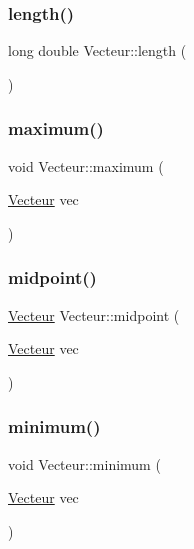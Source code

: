 \mbox{\label{classVecteur_a2679bc92e61a0ac2ddffed113eb2b00d}} 
\subsubsection{\texorpdfstring{length()}{length()}}
{\footnotesize\ttfamily long double Vecteur\+::length (\begin{DoxyParamCaption}{ }\end{DoxyParamCaption})}

\mbox{\label{classVecteur_acdb9760e842eeea4c2dc285713f97bf2}} 
\subsubsection{\texorpdfstring{maximum()}{maximum()}}
{\footnotesize\ttfamily void Vecteur\+::maximum (\begin{DoxyParamCaption}\item[{\mbox{\hyperlink{classVecteur}{Vecteur}}}]{vec }\end{DoxyParamCaption})}

\mbox{\label{classVecteur_a02fe1ecb17ffe58c304b38d9ab6239a5}} 
\subsubsection{\texorpdfstring{midpoint()}{midpoint()}}
{\footnotesize\ttfamily \mbox{\hyperlink{classVecteur}{Vecteur}} Vecteur\+::midpoint (\begin{DoxyParamCaption}\item[{\mbox{\hyperlink{classVecteur}{Vecteur}}}]{vec }\end{DoxyParamCaption})}

\mbox{\label{classVecteur_ad7b877d84e920d435e80e1b91ff7f991}} 
\subsubsection{\texorpdfstring{minimum()}{minimum()}}
{\footnotesize\ttfamily void Vecteur\+::minimum (\begin{DoxyParamCaption}\item[{\mbox{\hyperlink{classVecteur}{Vecteur}}}]{vec }\end{DoxyParamCaption})}

